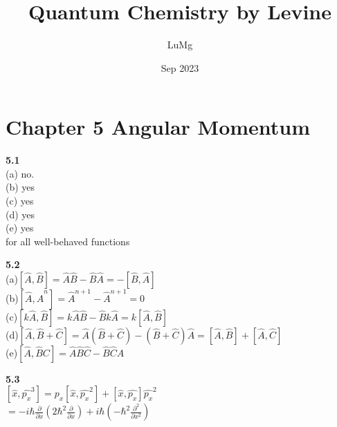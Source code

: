 \documentclass{article}
\title{Quantum Chemistry by Levine}
\author{LuMg}
\date{Sep 2023}
\begin{document}
\maketitle

\section{Chapter 5 Angular Momentum}
\textbf{5.1}\\
(a) no.\\
(b) yes\\
(c) yes\\
(d) yes\\
(e) yes\\
for all well-behaved functions\\
\newline

\textbf{5.2}\\
(a)$[\hat{A},\hat{B}] = \hat{A}\hat{B} - \hat{B}\hat{A} = -[\hat{B},\hat{A}]$\\
(b)$[\hat{A},\hat{A}^n] = \hat{A}^{n+1} - \hat{A}^{n+1} = 0$\\
(c)$[k\hat{A},\hat{B}] = k\hat{A}\hat{B} - \hat{B}k\hat{A} = k[\hat{A},\hat{B}]$\\
(d)$[\hat{A},\hat{B}+\hat{C}] = \hat{A}(\hat{B}+\hat{C}) - (\hat{B}+\hat{C})\hat{A} = [\hat{A},\hat{B}]+ [\hat{A},\hat{C}]$\\
(e)$[\hat{A},\hat{B}{C}] = \hat{A}\hat{B}\hat{C} - \hat{B}\hat{C}\hat{A}$\\
\newline

\textbf{5.3}\\
$[\hat{x},\hat{p_x}^3] = p_x[\hat{x},\hat{p_x}^2]+[\hat{x},\hat{p_x}]\hat{p_x}^2$\\
$=-i\hbar\frac{\partial}{\partial x}(2\hbar^2\frac{\partial}{\partial x})+i\hbar(-\hbar^2\frac{\partial^2}{\partial x^2})$\\
\newline
\end{document}
